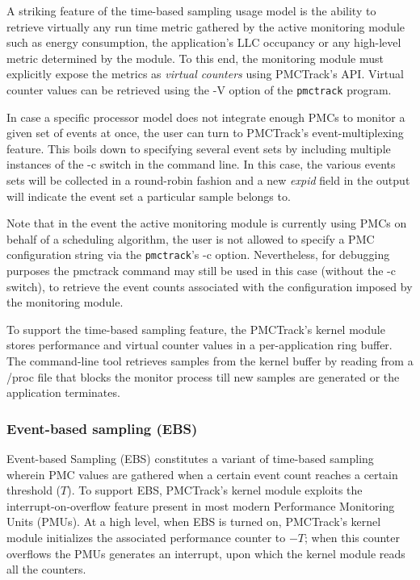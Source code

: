 A striking feature of the time-based sampling usage model is the ability
to retrieve virtually any run time metric gathered by the active
monitoring module such as energy consumption, the application's LLC
occupancy or any high-level metric determined by the module. To this
end, the monitoring module must explicitly expose the metrics as
\textit{virtual counters} using PMCTrack's API. Virtual counter values
can be retrieved using the -V option of the \texttt{pmctrack} program.

In case a specific processor model does not integrate enough PMCs to
monitor a given set of events at once, the user can turn to PMCTrack's
event-multiplexing feature. This boils down to specifying several event
sets by including multiple instances of the -c switch in the command
line. In this case, the various events sets will be collected in a
round-robin fashion and a new \textit{expid} field in the output will
indicate the event set a particular sample belongs to.

Note that in the event the active monitoring module is currently using
PMCs on behalf of a scheduling algorithm, the user is not allowed to
specify a PMC configuration string via the \texttt{pmctrack}'s -c
option. Nevertheless, for debugging purposes the pmctrack command may
still be used in this case (without the -c switch), to retrieve the
event counts associated with the configuration imposed by the monitoring
module.

To support the time-based sampling feature, the PMCTrack's kernel module
stores performance and virtual counter values in a per-application ring
buffer. The command-line tool retrieves samples from the kernel buffer
by reading from a /proc file that blocks the monitor process till new
samples are generated or the application terminates.

\subsubsection{Event-based sampling
(EBS)}\label{event-based-sampling-ebs}

Event-based Sampling (EBS) constitutes a variant of time-based sampling
wherein PMC values are gathered when a certain event count reaches a
certain threshold ($T$). To support EBS, PMCTrack's kernel module
exploits the interrupt-on-overflow feature present in most modern
Performance Monitoring Units (PMUs). At a high level, when EBS is turned
on, PMCTrack's kernel module initializes the associated performance
counter to $-T$; when this counter overflows the PMUs generates an
interrupt, upon which the kernel module reads all the counters.

